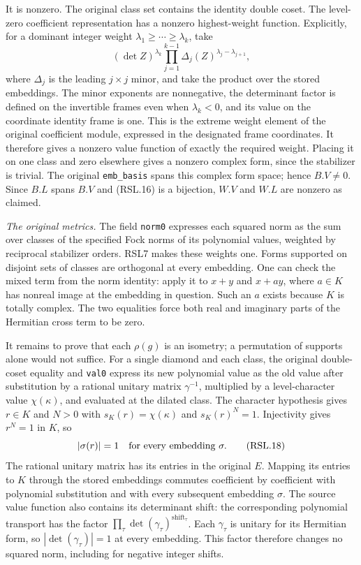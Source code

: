 It is nonzero.  The original class set contains the identity
double coset.  The level-zero coefficient representation has a
nonzero highest-weight function.  Explicitly, for a dominant
integer weight $\lambda_1\ge\cdots\ge\lambda_k$, take
\[
 (\det Z)^{\lambda_k}
       \prod_{j=1}^{k-1}\Delta_j(Z)^{\lambda_j-\lambda_{j+1}},
\]
where $\Delta_j$ is the leading $j\times j$ minor, and take
the product over the stored embeddings.  The minor exponents
are nonnegative, the determinant factor is defined on the
invertible frames even when $\lambda_k<0$, and its value on
the coordinate identity frame is one.  This is the extreme
weight element of the original coefficient module, expressed
in the designated frame coordinates.  It therefore gives a
nonzero value function of exactly the required weight.
Placing it on one class and zero elsewhere gives a nonzero
complex form, since the stabilizer is trivial.  The original
\texttt{emb\_basis} spans this complex form space; hence
$B.V\ne0$.  Since $B.L$ spans $B.V$ and (RSL.16) is a
bijection, $W.V$ and $W.L$ are nonzero as claimed.

\emph{The original metrics.}
The field \texttt{norm0} expresses each squared norm as the
sum over classes of the specified Fock norms of its polynomial
values, weighted by reciprocal stabilizer orders.  RSL7 makes
these weights one.  Forms supported on disjoint sets of classes
are orthogonal at every embedding.  One can check the mixed
term from the norm identity: apply it to $x+y$ and $x+a y$,
where $a\in K$ has nonreal image at the embedding in question.
Such an $a$ exists because $K$ is totally complex.  The two
equalities force both real and imaginary parts of the Hermitian
cross term to be zero.

It remains to prove that each $\rho(g)$ is an isometry; a
permutation of supports alone would not suffice.  For a single
diamond and each class, the original double-coset equality and
\texttt{val0} express its new polynomial value as the old value
after substitution by a rational unitary matrix $\gamma^{-1}$,
multiplied by a level-character value $\chi(\kappa)$, and
evaluated at the dilated class.  The character hypothesis gives
$r\in K$ and $N>0$ with
$s_K(r)=\chi(\kappa)$ and $s_K(r)^N=1$.
Injectivity gives $r^N=1$ in $K$, so
\[
                         |\sigma(r)|=1
                   \quad\hbox{for every embedding }\sigma.
                                                                  \tag{RSL.18}
\]
The rational unitary matrix has its entries in the original
$E$.  Mapping its entries to $K$ through the stored embeddings
commutes coefficient by coefficient with polynomial
substitution and with every subsequent embedding $\sigma$.
The source value function also contains its determinant shift:
the corresponding polynomial transport has the factor
$\prod_\tau\det(\gamma_\tau)^{\mathrm{shift}_\tau}$.
Each $\gamma_\tau$ is unitary for its Hermitian form, so
$|\det(\gamma_\tau)|=1$ at every embedding.  This factor
therefore changes no squared norm, including for negative
integer shifts.

